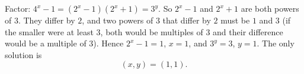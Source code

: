 Factor: $4^x-1=\left(2^x-1\right)\left(2^x+1\right)=3^y$. So $2^x-1$ and $2^x+1$ are both powers of $3$. They differ by $2$, and two powers of $3$ that differ by $2$ must be $1$ and $3$ (if the smaller were at least $3$, both would be multiples of $3$ and their difference would be a multiple of $3$). Hence $2^x-1=1$, $x=1$, and $3^y=3$, $y=1$. The only solution is
\[\boxed{(x,y)=(1,1)}.\]
